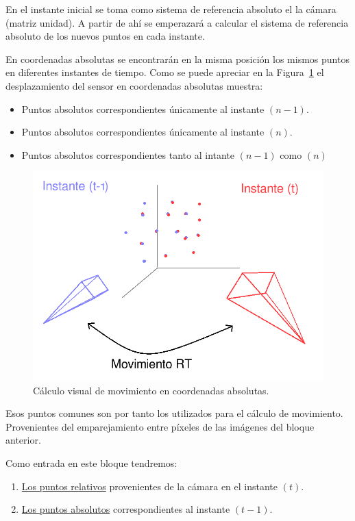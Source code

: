 En el instante inicial se toma como sistema de referencia absoluto el la cámara (matriz unidad). A partir de ahí se emperazará a calcular el sistema de referencia absoluto de los nuevos puntos en cada instante.

En coordenadas absolutas se encontrarán en la misma posición los mismos puntos en diferentes instantes de tiempo. Como se puede apreciar en la Figura~\ref{fig:movementRt} el desplazamiento del sensor en coordenadas absolutas muestra:

\begin{itemize}
\item Puntos absolutos correspondientes únicamente al instante $(n-1)$.
\item Puntos absolutos correspondientes únicamente al instante $(n)$.
\item Puntos absolutos correspondientes tanto al intante $(n-1)$ como $(n)$
\end{itemize}

\begin{figure}[th]
\centering
\includegraphics[scale=0.4]{Figures/movement-rt.png}
\decoRule
\caption[movement-rt]{Cálculo visual de movimiento en coordenadas absolutas.}
\label{fig:movementRt}
\end{figure}

Esos puntos comunes son por tanto los utilizados para el cálculo de movimiento. Provenientes del emparejamiento entre píxeles de las imágenes del bloque anterior.

Como entrada en este bloque tendremos:

\begin{enumerate}
\item \underline{Los puntos relativos} provenientes de la cámara en el instante $(t)$.
\item \underline{Los puntos absolutos} correspondientes al instante $(t-1)$.
\end{enumerate}

